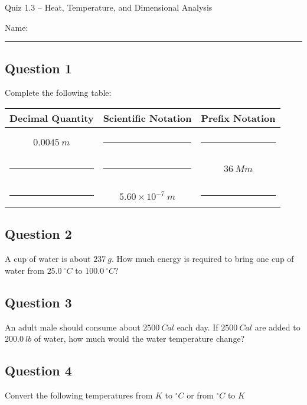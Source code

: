 \documentclass[11pt, letterpaper]{memoir}
\begin{document}
	\begin{center}
		{\large Quiz 1.3 --	Heat, Temperature, and Dimensional Analysis}
	\end{center}
	{\large Name: \rule[-1mm]{4in}{.1pt} 
	\subsection*{Question 1}
	Complete the following table:
	
	\begin{tabular}{ccc}
	Decimal Quantity & Scientific Notation & Prefix Notation \\ \midrule \\
	$0.0045~m$ & \rule[-2pt]{8em}{1pt} & \rule[-2pt]{8em}{1pt} \\ \\
	\rule[-2pt]{8em}{1pt} & \rule[-2pt]{8em}{1pt} & $36~Mm$ \\ \\
	\rule[-2pt]{8em}{1pt} & $5.60\times10^{-7}~m$ & \rule[-2pt]{8em}{1pt} \\
	\end{tabular}
	
	\subsection*{Question 2}
	A cup of water is about $237~g$. How much energy is required to bring one cup of water from $25.0~^\circ C$ to $100.0~^\circ C$?
	
	\vspace{3em}
	\subsection*{Question 3}
	An adult male should consume about $2500~Cal$ each day. If $2500~Cal$ are added to $200.0~lb$ of water, how much would the water temperature change?
	
	\vspace{3em}
	\subsection*{Question 4}
	Convert the following temperatures from $K$ to $^\circ C$ or from $^\circ C$ to $K$
	
	
}
\end{document}

